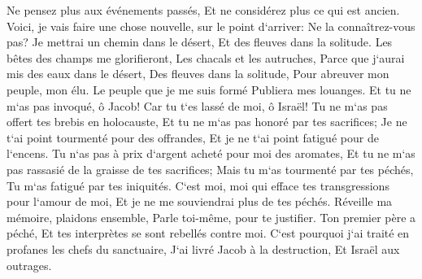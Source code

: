 \verse Ne pensez plus aux événements passés, Et ne considérez plus ce qui est ancien. 
\verse Voici, je vais faire une chose nouvelle, sur le point d`arriver: Ne la connaîtrez-vous pas? Je mettrai un chemin dans le désert, Et des fleuves dans la solitude. 
\verse Les bêtes des champs me glorifieront, Les chacals et les autruches, Parce que j`aurai mis des eaux dans le désert, Des fleuves dans la solitude, Pour abreuver mon peuple, mon élu. 
\verse Le peuple que je me suis formé Publiera mes louanges. 
\verse Et tu ne m`as pas invoqué, ô Jacob! Car tu t`es lassé de moi, ô Israël! 
\verse Tu ne m`as pas offert tes brebis en holocauste, Et tu ne m`as pas honoré par tes sacrifices; Je ne t`ai point tourmenté pour des offrandes, Et je ne t`ai point fatigué pour de l`encens. 
\verse Tu n`as pas à prix d`argent acheté pour moi des aromates, Et tu ne m`as pas rassasié de la graisse de tes sacrifices; Mais tu m`as tourmenté par tes péchés, Tu m`as fatigué par tes iniquités. 
\verse C`est moi, moi qui efface tes transgressions pour l`amour de moi, Et je ne me souviendrai plus de tes péchés. 
\verse Réveille ma mémoire, plaidons ensemble, Parle toi-même, pour te justifier. 
\verse Ton premier père a péché, Et tes interprètes se sont rebellés contre moi. 
\verse C`est pourquoi j`ai traité en profanes les chefs du sanctuaire, J`ai livré Jacob à la destruction, Et Israël aux outrages. 

